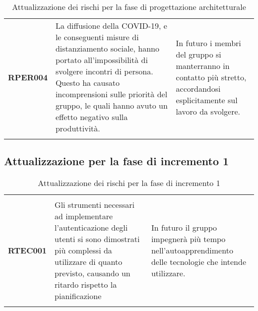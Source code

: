 \documentclass[../piano-di-progetto]{subfiles}
\begin{document}
\begin{longtable}[H]{|p{10em}|p{17em}|p{17em}|}
  \textbf{RPER004}                & La diffusione della COVID-19, e le conseguenti misure di distanziamento sociale, hanno portato all'impossibilità di svolgere incontri di persona. Questo ha causato incomprensioni sulle priorità del gruppo, le quali hanno avuto un effetto negativo sulla produttività.                                                                                                                                                                  & In futuro i membri del gruppo si manterranno in contatto più stretto, accordandosi esplicitamente sul lavoro da svolgere.                                                                                                                                                                                                                                                                                         \\
  \rowcolor{white}
  \caption{Attualizzazione dei rischi per la fase di progettazione architetturale}%
  \label{tab:attualizzazione_per_la_fase_di_progettazione_architetturale}
\end{longtable}

\subsection{Attualizzazione per la fase di incremento 1}%
\label{sub:attualizzazione_per_la_fase_di_incremento_1}

\begin{longtable}[H]{|p{10em}|p{17em}|p{17em}|}
  \rowcolor{darkgray!90!}
  \color{white}{\textbf{Rischio}} & \color{white}{\textbf{Gestione}}                                                                                                                                                        & \color{white}{\textbf{Monitoraggio}}                                                       \\
  \textbf{RTEC001}                & Gli strumenti necessari ad implementare l'autenticazione degli utenti si sono dimostrati più complessi da utilizzare di quanto previsto, causando un ritardo rispetto la pianificazione & In futuro il gruppo impegnerà più tempo nell'autoapprendimento delle tecnologie che intende utilizzare. \\
  \rowcolor{white}
  \caption{Attualizzazione dei rischi per la fase di incremento 1}%
  \label{tab:attualizzazione_per_la_fase_di_incremento_1}
\end{longtable}

\end{document}
